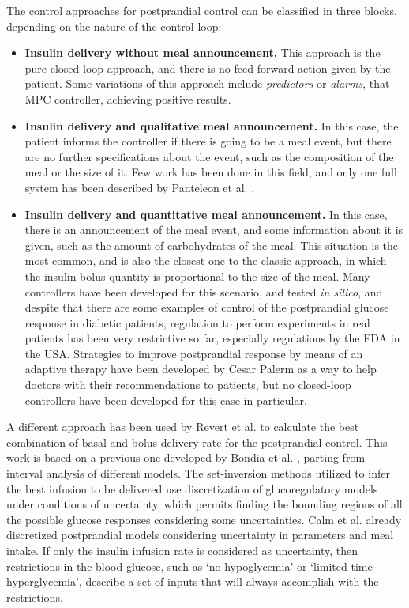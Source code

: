 The control approaches for postprandial control can be classified in three blocks, depending on the nature of the control loop:
\begin{itemize}
	\item \textbf{Insulin delivery without meal announcement.} This approach is the pure closed loop approach, and there is no feed-forward action given by the patient. Some variations of this approach include \textit{predictors} or \textit{alarms}, that MPC controller, achieving positive results.
	\item \textbf{Insulin delivery and qualitative meal announcement.} In this case, the patient informs the controller if there is going to be a meal event, but there are no further specifications about the event, such as the composition of the meal or the size of it. Few work has been done in this field, and only one full system has been described by Panteleon et al. \cite{panteleon2004novel}.
	\item \textbf{Insulin delivery and quantitative meal announcement.} In this case, there is an announcement of the meal event, and some information about it is given, such as the amount of carbohydrates of the meal. This situation is the most common, and is also the closest one to the classic approach, in which the insulin bolus quantity is proportional to the size of the meal. Many controllers have been developed for this scenario, and tested \textit{in silico}, and despite that there are some examples of control of the postprandial glucose response in diabetic patients, regulation to perform experiments in real patients has been very restrictive so far, especially regulations by the FDA in the USA. Strategies to improve postprandial response by means of an adaptive therapy have been developed by Cesar Palerm \cite{palerm2008run} \cite{palerm2007prandial} as a way to help doctors with their recommendations to patients, but no closed-loop controllers have been developed for this case in particular.
\end{itemize}
A different approach has been used by Revert et al. \cite{anaATTD2010} to calculate the best combination of basal and bolus delivery rate for the postprandial control. This work is based on a previous one developed by Bondia et al. \cite{jorgeibolus}, parting from interval analysis of different models. The set-inversion methods utilized to infer the best infusion to be delivered use discretization of glucoregulatory models under conditions of uncertainty, which permits finding the bounding regions of all the possible glucose responses considering some uncertainties. Calm et al. \cite{calm2007prediction} already discretized postprandial models considering uncertainty in parameters and meal intake. If only the insulin infusion rate is considered as uncertainty, then restrictions in the blood glucose, such as `no hypoglycemia' or `limited time hyperglycemia', describe a set of inputs that will always accomplish with the restrictions.

